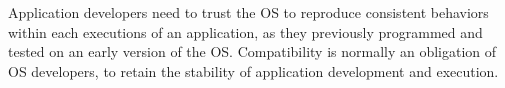 Application developers need to trust the OS to reproduce consistent behaviors within each executions of an application,
as they previously programmed and tested on an early version of the OS.
Compatibility is normally an obligation of OS developers, to retain the stability of application development and execution.



